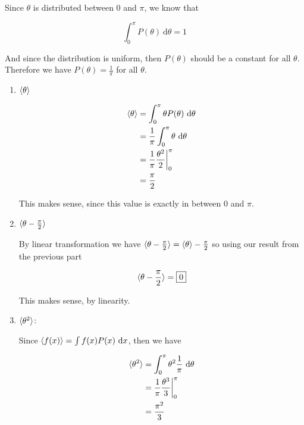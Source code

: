 \documentclass{article}
\begin{document}
\begin{solution}

    Since $\theta$ is distributed between $0$ and $\pi$, we know that 

    \[ \int_0^\pi P(\theta) \ \mathrm d \theta= 1\]

    And since the distribution is uniform, then $P(\theta)$ should be a constant for all $\theta$. Therefore we have $P(\theta) = \frac{1}{\pi}$ for all $\theta$.
\end{solution}
\begin{enumerate}[label=(\alph*)]
    \item $\langle \theta \rangle$
    
    \begin{solution}
        \begin{align*}
            \langle \theta \rangle &= \int_0^\pi \theta P(\theta) \ \mathrm d \theta\\
            &= \frac{1}{\pi} \int_0^\pi \theta \ \mathrm d \theta \\
            &= \frac{1}{\pi} \frac{\theta^2}{2}\bigg|_0^\pi\\
            &= \frac{\pi}{2}
        \end{align*}

        This makes sense, since this value is exactly in between $0$ and $\pi$.
    \end{solution}
    
    
    \item $\langle \theta - \frac{\pi}{2} \rangle$
    
    \begin{solution}
        By linear transformation we have $\langle \theta - \frac{\pi}{2} \rangle = \langle \theta \rangle - \frac{\pi}{2}$ so using our result from the previous part 

        \[ \langle \theta - \frac{\pi}{2} \rangle = \boxed{0}\]

        This makes sense, by linearity.
    \end{solution}


    \item $\langle \theta^2 \rangle$:
    
    \begin{solution}
        Since $\langle f(x) \rangle = \int f(x) P(x) \ \mathrm d x$, then we have

        \begin{align*}
            \langle \theta^2 \rangle &= \int_0^\pi \theta^2 \frac{1}{\pi} \ \mathrm d \theta\\
            &= \frac{1}{\pi}\frac{\theta^3}{3}\bigg|_0^\pi\\
            &= \frac{\pi^2}{3}
        \end{align*}


\end{solution}
\end{enumerate}
\end{document}

